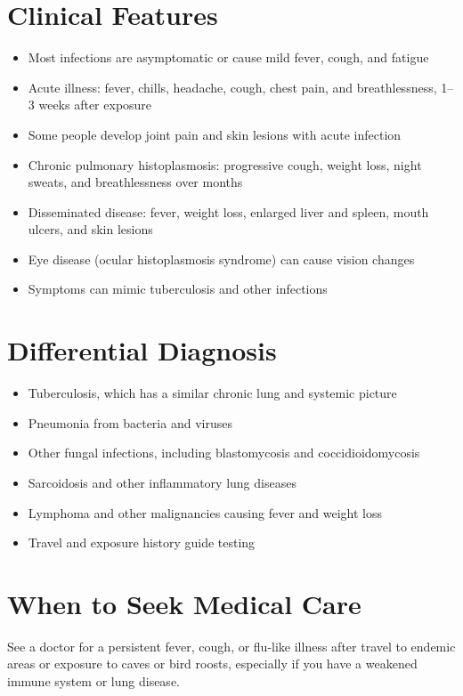 \section*{Clinical Features}
\begin{itemize}
    \item Most infections are asymptomatic or cause mild fever, cough, and fatigue
    \item Acute illness: fever, chills, headache, cough, chest pain, and breathlessness, 1--3 weeks after exposure
    \item Some people develop joint pain and skin lesions with acute infection
    \item Chronic pulmonary histoplasmosis: progressive cough, weight loss, night sweats, and breathlessness over months
    \item Disseminated disease: fever, weight loss, enlarged liver and spleen, mouth ulcers, and skin lesions
    \item Eye disease (ocular histoplasmosis syndrome) can cause vision changes
    \item Symptoms can mimic tuberculosis and other infections
\end{itemize}

\section*{Differential Diagnosis}
\begin{itemize}
    \item Tuberculosis, which has a similar chronic lung and systemic picture
    \item Pneumonia from bacteria and viruses
    \item Other fungal infections, including blastomycosis and coccidioidomycosis
    \item Sarcoidosis and other inflammatory lung diseases
    \item Lymphoma and other malignancies causing fever and weight loss
    \item Travel and exposure history guide testing
\end{itemize}

\section*{When to Seek Medical Care}
See a doctor for a persistent fever, cough, or flu-like illness after travel to endemic areas or exposure to caves or bird roosts, especially if you have a weakened immune system or lung disease.

